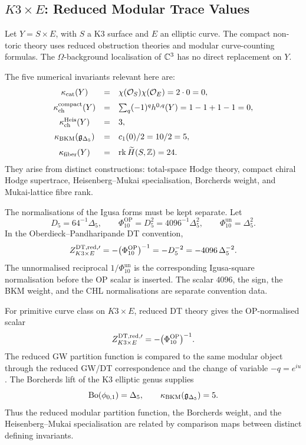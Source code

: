 \subsection*{\texorpdfstring{$K3\times E$}{K3 x E}: Reduced Modular
Trace Values}
\label{subsec:k3e-reduced-modular-trace}

Let \(Y=S\times E\), with \(S\) a K3 surface and \(E\) an elliptic
curve.  The compact non-toric theory uses reduced obstruction theories
and modular curve-counting formulas.  The \(\Omega\)-background
localisation of \(\mathbb{C}^3\) has no direct replacement on \(Y\).

The five numerical invariants relevant here are:
\[
\begin{array}{ccl}
\kappa_{\mathrm{cat}}(Y) &=& \chi(\mathcal{O}_S)\chi(\mathcal{O}_E)=2\cdot0=0,\\[2mm]
\kappa_{\mathrm{ch}}^{\mathrm{compact}}(Y) &=&
  \sum_q(-1)^qh^{0,q}(Y)=1-1+1-1=0,\\[2mm]
\kappa_{\mathrm{ch}}^{\mathrm{Heis}}(Y) &=& 3,\\[2mm]
\kappa_{\mathrm{BKM}}(\mathfrak g_{\Delta_{5}}) &=& c_1(0)/2=10/2=5,\\[2mm]
\kappa_{\mathrm{fiber}}(Y) &=& \mathrm{rk}\,\widetilde H(S,\mathbb{Z})=24.
\end{array}
\]
They arise from distinct constructions: total-space Hodge theory,
compact chiral Hodge supertrace, Heisenberg--Mukai specialisation,
Borcherds weight, and Mukai-lattice fibre rank.

The normalisations of the Igusa forms must be kept separate.  Let
\[
  D_{5}=64^{-1}\Delta_{5},\qquad
  \Phi^{\mathrm{OP}}_{10}=D_{5}^2=4096^{-1}\Delta_{5}^2,\qquad
  \Phi^{\mathrm{un}}_{10}=\Delta_{5}^2.
\]
In the Oberdieck--Pandharipande DT convention,
\[
  Z^{\mathrm{DT},\mathrm{red},\prime}_{K3\times E}
  =
  -\bigl(\Phi^{\mathrm{OP}}_{10}\bigr)^{-1}
  =
  -D_{5}^{-2}
  =
  -4096\,\Delta_{5}^{-2}.
\]
The unnormalised reciprocal \(1/\Phi^{\mathrm{un}}_{10}\) is the
corresponding Igusa-square normalisation before the OP scalar is
inserted.  The scalar \(4096\), the sign, the BKM weight, and the
CHL normalisations are separate convention data.

\begin{theorem}
\label{wn:thm:k3e-reduced-comparison}
For primitive curve class on \(K3\times E\), reduced DT theory gives
the OP-normalised scalar
\[
  Z^{\mathrm{DT},\mathrm{red},\prime}_{K3\times E}
  =
  -\bigl(\Phi^{\mathrm{OP}}_{10}\bigr)^{-1}.
\]
The reduced GW partition function is compared to the same modular
object through the reduced GW/DT correspondence and the change of
variable \(-q=e^{iu}\).  The Borcherds lift of the K3 elliptic genus
supplies
\[
  \mathrm{Bo}(\phi_{0,1})=\Delta_{5},
  \qquad
  \kappa_{\mathrm{BKM}}(\mathfrak g_{\Delta_{5}})=5.
\]
Thus the reduced modular partition function, the Borcherds weight, and
the Heisenberg--Mukai specialisation are related by comparison maps
between distinct defining invariants.
\end{theorem}

